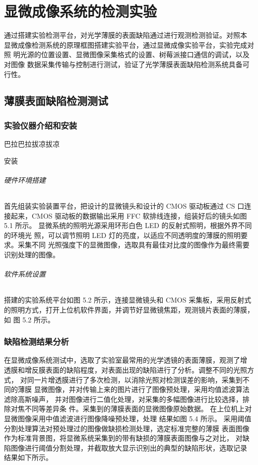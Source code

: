 \chapter{显微成像系统的检测实验}

通过搭建实验检测平台，对光学薄膜的表面缺陷通过进行观测检测验证。对照本 显微成像检测系统的原理框图搭建实验平台，通过显微成像实验平台，实验完成对照 明光源的位置设置、显微图像采集格式的设置、树莓派接口通信的调试，以及对图像 数据采集传输与控制进行测试，验证了光学薄膜表面缺陷检测系统具备可行性。

\section{薄膜表面缺陷检测测试}

\subsection{实验仪器介绍和安装}
巴拉巴拉拔凉拔凉

安装

\subparagraph{硬件环境搭建}
首先组装实验装置平台，把设计的显微镜头和设计的 CMOS 驱动板通过 CS 口连 接起来，CMOS 驱动板的数据输出采用 FFC 软排线连接，组装好后的镜头如图 5.1 所示。
显微系统的照明光源采用环形白色 LED 的反射式照明，根据外界不同的环境光 照，可以调节照明 LED 灯的亮度，以适应不同透明度的薄膜的照明要求。采集不同 光照强度下的显微图像，选取具有最佳对比度的图像作为最终需要识别处理的图像。 
\subparagraph{软件系统设置}

搭建的实验系统平台如图 5.2 所示，连接显微镜头和 CMOS 采集板，采用反射式 的照明方式，打开上位机软件界面，并调节好显微镜焦距，观测镜片表面的薄膜，如 图 5.2 所示。

\subsection{缺陷检测结果分析}
在显微成像系统测试中，选取了实验室最常用的光学透镜的表面薄膜，观测了增 透膜和增反膜表面的缺陷程度，对表面出现的缺陷进行了分析。调整不同的光照方式， 对同一片增透膜进行了多次检测，以消除光照对检测误差的影响，采集到不同的薄膜 显微图像，并对传输上来的图片进行了图像预处理，采用均值滤波算法滤除高斯噪声， 并对图像进行二值化处理，对采集的多幅图像进行比较选择，排除对焦不同等差异条 件。采集到的薄膜表面的显微图像原始数据。
在上位机上对显微图像采用中值滤波进行图像降噪预处理，处理 结果如图 5.4 所示。
采用阈值分割处理算法对预处理过的图像做缺损检测处理，选定标准完整的薄膜 表面图像作为标准背景图，将显微系统采集到的带有缺损的薄膜表面图像与之对比， 对缺陷图像进行阈值分割处理，并截取放大显示识别出的典型的缺陷形状，选取记录 结果如下所示。

